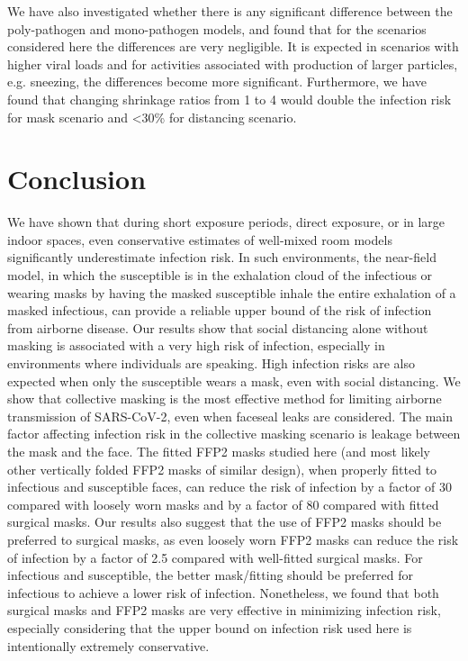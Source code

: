 \documentclass[preprint]{elsarticle}
\begin{document}
We have also investigated whether there is any significant difference between the poly-pathogen and mono-pathogen models, and found that for the scenarios considered here the differences are very negligible.  
It is expected in scenarios with higher viral loads and for activities associated with production of larger particles, e.g. sneezing, the differences become more significant. 
Furthermore, we have found that changing shrinkage ratios from 1 to 4 would double the infection risk for mask scenario and \textless30\% for distancing scenario. 


\section{Conclusion}
We have shown that during short exposure periods, direct exposure, or in large indoor spaces, even conservative estimates of well-mixed room models significantly underestimate infection risk. In such environments, the near-field model, in which the susceptible is in the exhalation cloud of the infectious or wearing masks by having the masked susceptible inhale the entire exhalation of a masked infectious, can provide a reliable upper bound of the risk of infection from airborne disease. Our results show that social distancing alone without masking is associated with a very high risk of infection, especially in environments where individuals are speaking. High infection risks are also expected when only the susceptible wears a mask, even with social distancing. We show that collective masking is the most effective method for limiting airborne transmission of SARS-CoV-2, even when faceseal leaks are considered.  The main factor affecting infection risk in the collective masking scenario is leakage between the mask and the face. The fitted FFP2 masks studied here (and most likely other vertically folded FFP2 masks of similar design), when properly fitted to infectious and susceptible faces, can reduce the risk of infection by a factor of 30 compared with loosely worn masks and by a factor of 80 compared with fitted surgical masks.  Our results also suggest that the use of FFP2 masks should  be preferred to surgical masks, as even loosely worn FFP2 masks can reduce the risk of infection by a factor of 2.5 compared with well-fitted surgical masks. For infectious and susceptible, the better mask/fitting should be preferred for infectious to achieve a lower risk of infection.  Nonetheless, we found that both surgical masks and FFP2 masks are very effective in minimizing infection risk, especially considering that the upper bound on infection risk used here is intentionally extremely conservative.
\end{document}
